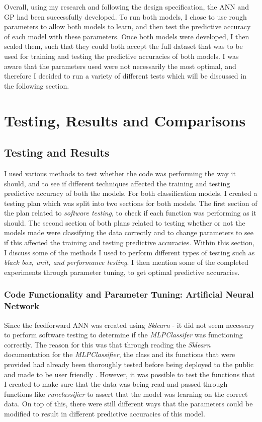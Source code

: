 \documentclass[11pt]{article}
\begin{document}
Overall, using my research and following the design specification, the ANN and GP had been successfully developed. To run both models, I chose to use rough parameters to allow both models to learn, and then test the predictive accuracy of each model with these parameters. Once both models were developed, I then scaled them, such that they could both accept the full dataset that was to be used for training and testing the predictive accuracies of both models. I was aware that the parameters used were not necessarily the most optimal, and therefore I decided to run a variety of different tests which will be discussed in the following section.
\section{Testing, Results and Comparisons} \label{sec:TRC}
\subsection{Testing and Results}\label{subsec:TnR}
I used various methods to test whether the code was performing the way it should, and to see if different techniques affected the training and testing predictive accuracy of both the models. For both classification models, I created a testing plan which was split into two sections for both models. The first section of the plan related to \textit{software testing}, to check if each function was performing as it should. The second section of both plans related to testing whether or not the models made were classifying the data correctly and to change parameters to see if this affected the training and testing predictive accuracies. Within this section, I discuss some of the methods I used to perform different types of testing such as \textit{\textit{black box}, unit, and performance testing}. I then mention some of the completed experiments through parameter tuning, to get optimal predictive accuracies. 
\subsubsection{Code Functionality and Parameter Tuning: Artificial Neural Network}\label{subsubsec:CFPT}
Since the feedforward ANN was created using \textit{Sklearn} - it did not seem necessary to perform software testing to determine if the \textit{MLPClassifer} was functioning correctly. The reason for this was that through reading the \textit{Sklearn} documentation for the \textit{MLPClassifier}, the class and its functions that were provided had already been thoroughly tested before being deployed to the public and made to be user friendly \cite{ref-sklearn,ref-absk}. However, it was possible to test the functions that I created to make sure that the data was being read and passed through functions like \textit{run\textunderscore classifier} to assert that the model was learning on the correct data. On top of this, there were still different ways that the parameters could be modified to result in different predictive accuracies of this model. 
\end{document}
